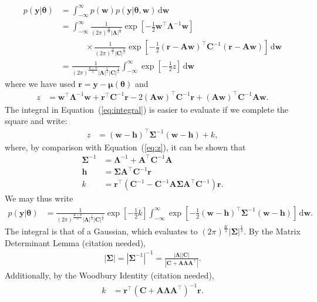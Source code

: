 \documentclass[modern]{rnaastex}
\renewcommand{\eqref}[1]{\ref{eq:#1}}
\newcommand{\Eq}[1]{Equation~(\eqref{#1})}
\newcommand{\eq}[1]{\Eq{#1}}
\newcommand{\eqlabel}[1]{\label{eq:#1}}
\newcommand{\dd}{\ensuremath{\,\mathrm{d}}}
\newcommand{\bvec}[1]{{\ensuremath{\boldsymbol{#1}}}}
\newcommand{\citeme}{{\color{red}(citation needed)}}
\newcommand{\Gaussian}[3]{\ensuremath{\frac{1}{(2\pi)^\frac{#3}{2}|#2|^\frac{1}{2}}
            \exp\left[ -\frac{1}{2}#1^\top #2^{-1} #1 \right]}}
\newcommand{\mA}{\ensuremath{\bvec{A}}}
\newcommand{\mC}{\ensuremath{\bvec{C}}}
\newcommand{\mS}{\ensuremath{\bvec{\Sigma}}}
\newcommand{\mL}{\ensuremath{\bvec{\Lambda}}}
\newcommand{\vw}{\ensuremath{\bvec{w}}}
\newcommand{\vy}{\ensuremath{\bvec{y}}}
\newcommand{\vt}{\ensuremath{\bvec{\theta}}}
\newcommand{\vm}{\ensuremath{\bvec{\mu}(\bvec{\theta})}}
\newcommand{\vre}{\ensuremath{\bvec{r}}}
\newcommand{\vh}{\ensuremath{\bvec{h}}}
\begin{document}
\begin{align}
\eqlabel{integral}
p(\vy | \vt) &= \int_{-\infty}^{\infty} p(\vw) p(\vy | \vt, \vw) \dd\vw \nonumber \\
%
             &= \int_{-\infty}^{\infty} \Gaussian{\vw}{\mL}{K} \nonumber\\
             & \quad\quad\quad \times \Gaussian{(\vre - \mA \vw)}{\mC}{N}
               \dd\vw \nonumber \\
%
             &= \frac{1}{(2 \pi)^\frac{K + N}{2} |\mL|^\frac{1}{2} |\mC|^\frac{1}{2}}
                \int_{-\infty}^{\infty} \exp \left[ -\frac{1}{2} z \right] \dd\vw
\end{align}
%
where we have used $\vre = \vy - \vm$ and
%
\begin{align}
\eqlabel{z}
z &= \vw^\top \mL^{-1} \vw + \vre^\top \mC^{-1} \vre -
     2(\mA \vw)^\top \mC^{-1} \vre + (\mA \vw)^\top \mC^{-1} \mA \vw.
\end{align}
%
The integral in \eq{integral} is easier to evaluate if we
complete the square and write:
%
\begin{align}
\eqlabel{z_square}
z &= (\vw - \vh)^\top \mS^{-1} (\vw - \vh) + k,
\end{align}
%
where, by comparison with \eq{z}, it can be shown that
%
\begin{align}
\mS^{-1} &= \mL^{-1} + \mA^\top \mC^{-1} \mA \\
%
\vh &= \bvec{\Sigma}\mA^\top \mC^{-1} \vre \\
%
k &= \vre^\top \left( \mC^{-1} - \mC^{-1} \mA \mS \mA^\top \mC^{-1} \right) \vre.
\end{align}
%
We may thus write
%
\begin{align}
\eqlabel{p(y|t)ugly}
p(\vy | \vt) &= \frac{1}{(2 \pi)^\frac{K + N}{2}
                |\mL|^\frac{1}{2}
                |\mC|^\frac{1}{2}}
                \exp \left[ -\frac{1}{2}k \right]
                \int_{-\infty}^{\infty} \exp
                \left[-\frac{1}{2}(\vw - \vh)^\top \mS^{-1} (\vw - \vh)
                \right] \dd\vw.
\end{align}
%
The integral is that of a Gaussian, which evaluates to 
$(2\pi)^\frac{K}{2}|\bvec{\Sigma}|^\frac{1}{2}$. 
By the Matrix Determinant Lemma \citeme, 
%
\begin{align}
|\mS| = {|\mS^{-1}|}^{-1} = \frac{|\mL| |\mC|}{|\mC + \mA \mL \mA^\top|}.
\end{align}
%
%
Additionally, by the Woodbury Identity \citeme,
%
\begin{align}
k &= \vre^\top \left( \mC + \mA \mL \mA^\top \right)^{-1} \vre.
\end{align}
\end{document}

